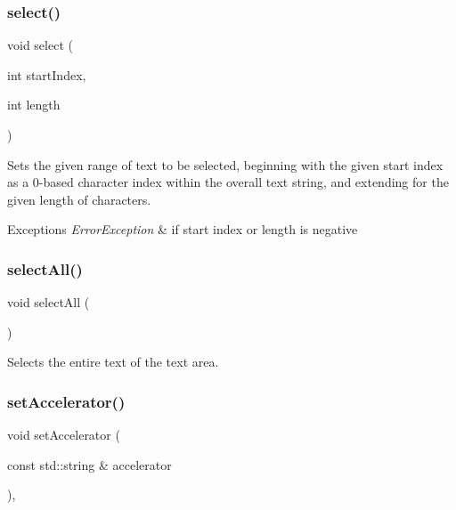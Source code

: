 \subsubsection{\texorpdfstring{select()}{select()}}
{\footnotesize\ttfamily void select (\begin{DoxyParamCaption}\item[{int}]{start\+Index,  }\item[{int}]{length }\end{DoxyParamCaption})\hspace{0.3cm}{\ttfamily [virtual]}}



Sets the given range of text to be selected, beginning with the given start index as a 0-\/based character index within the overall text string, and extending for the given length of characters. 


\begin{DoxyExceptions}{Exceptions}
{\em Error\+Exception} & if start index or length is negative \\
\hline
\end{DoxyExceptions}
\mbox{\label{classsgl_1_1GTextArea_ab6658ed404200bd7aaca5629db064645}} 
\subsubsection{\texorpdfstring{select\+All()}{selectAll()}}
{\footnotesize\ttfamily void select\+All (\begin{DoxyParamCaption}{ }\end{DoxyParamCaption})\hspace{0.3cm}{\ttfamily [virtual]}}



Selects the entire text of the text area. 

\mbox{\label{classsgl_1_1GInteractor_ad15f102f62e2960576012f1aa0ba4b2e}} 
\subsubsection{\texorpdfstring{set\+Accelerator()}{setAccelerator()}}
{\footnotesize\ttfamily void set\+Accelerator (\begin{DoxyParamCaption}\item[{const std\+::string \&}]{accelerator }\end{DoxyParamCaption})\hspace{0.3cm}{\ttfamily [virtual]}, {\ttfamily [inherited]}}



